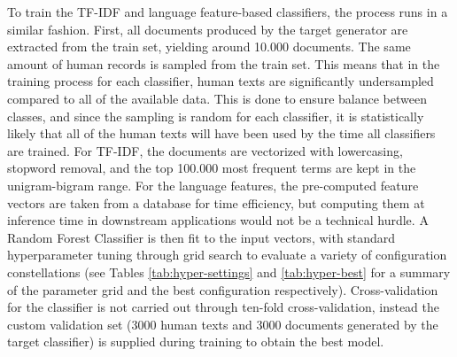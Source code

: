 To train the TF-IDF and language feature-based classifiers, the process runs in a similar fashion.
First, all documents produced by the target generator are extracted from the train set, yielding around 10.000 documents.
The same amount of human records is sampled from the train set.
This means that in the training process for each classifier, human texts are significantly undersampled compared to all of the available data.
This is done to ensure balance between classes, and since the sampling is random for each classifier, it is statistically likely that all of the human texts will have been used by the time all classifiers are trained.
For TF-IDF, the documents are vectorized with lowercasing, stopword removal, and the top 100.000 most frequent terms are kept in the unigram-bigram range.
For the language features, the pre-computed feature vectors are taken from a database for time efficiency, but computing them at inference time in downstream applications would not be a technical hurdle.
A Random Forest Classifier is then fit to the input vectors, with standard hyperparameter tuning through grid search to evaluate a variety of configuration constellations (see Tables \ref{tab:hyper-settings} and \ref{tab:hyper-best} for a summary of the parameter grid and the best configuration respectively).
Cross-validation for the classifier is not carried out through ten-fold cross-validation, instead the custom validation set (3000 human texts and 3000 documents generated by the target classifier) is supplied during training to obtain the best model.

